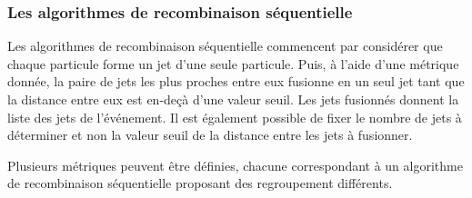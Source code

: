 \subsubsection{Les algorithmes de recombinaison séquentielle}
Les algorithmes de recombinaison séquentielle commencent par considérer que chaque particule forme un jet d'une seule particule.
Puis, à l'aide d'une métrique donnée, la paire de jets les plus proches entre eux fusionne en un seul jet tant que la distance entre eux est en-deçà d'une valeur seuil. Les jets fusionnés donnent la liste des jets de l'événement. Il est également possible de fixer le nombre de jets à déterminer et non la valeur seuil de la distance entre les jets à fusionner.
\par Plusieurs métriques peuvent être définies, chacune correspondant à un algorithme de recombinaison séquentielle proposant des regroupement différents.
